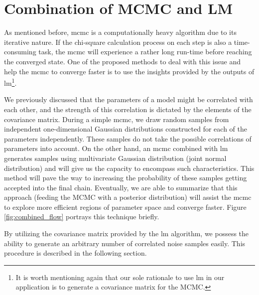 \documentclass[12pt, TexShade, letterpaper]{report}
\begin{document}
\section{Combination of MCMC and LM}
As mentioned before, \gls{mcmc} is a computationally heavy algorithm due to its iterative nature. If the chi-square calculation process on each step is also a time-consuming task, the \gls{mcmc} will experience a rather long run-time before reaching the converged state. One of the proposed methods to deal with this issue and help the \gls{mcmc} to converge faster is to use the insights provided by the outputs of \gls{lm}\footnote{It is worth mentioning again that our sole rationale to use \gls{lm} in our application is to generate a covariance matrix for the MCMC.}.\par
We previously discussed that the parameters of a model might be correlated with each other, and the strength of this correlation is dictated by the elements of the covariance matrix. During a simple \gls{mcmc}, we draw random samples from independent one-dimensional Gaussian distributions constructed for each of the parameters independently. These samples do not take the possible correlations of parameters into account. On the other hand, an \gls{mcmc} combined with \gls{lm} generates samples using multivariate Gaussian distribution (joint normal distribution) and will give us the capacity to encompass such characteristics. This method will pave the way to increasing the probability of these samples getting accepted into the final chain. Eventually, we are able to summarize that this approach (feeding the MCMC with a posterior distribution) will assist the \gls{mcmc} to explore more efficient regions of parameter space and converge faster. Figure \ref{fig:combined_flow} portrays this technique briefly.\par
By utilizing the covariance matrix provided by the \gls{lm} algorithm, we possess the ability to generate an arbitrary number of correlated noise samples easily. This procedure is described in the following section.\par
\end{document}
